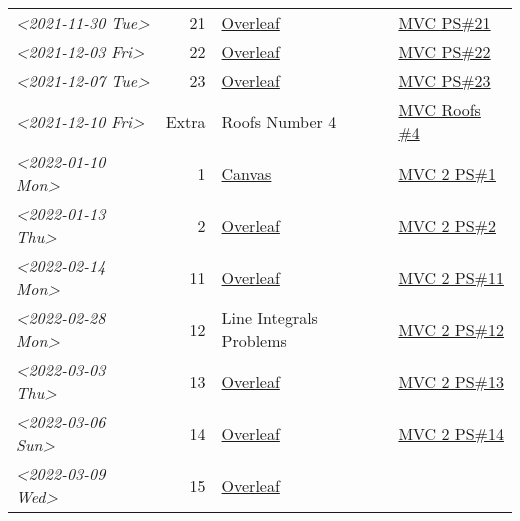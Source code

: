 \documentclass[letterpaper]{article}
\begin{document}
\begin{center}
\begin{tabular}{lrll}
\textit{<2021-11-30 Tue>} & 21 & \href{https://www.overleaf.com/read/ycjqxsjqhrqs}{Overleaf} & \href{../../../src/mathematics/multi_variable_calculus/KBhmvc_ps_21.org}{MVC PS\#21}\\
\textit{<2021-12-03 Fri>} & 22 & \href{https://www.overleaf.com/project/61aa47650d65cd6936cfd852}{Overleaf} & \href{../../../src/mathematics/multi_variable_calculus/KBhmvc_ps_22.org}{MVC PS\#22}\\
\textit{<2021-12-07 Tue>} & 23 & \href{https://www.overleaf.com/project/61ae7329269279ccbccb269f}{Overleaf} & \href{../../../src/mathematics/multi_variable_calculus/KBhmvc_ps_23.org}{MVC PS\#23}\\
\textit{<2021-12-10 Fri>} & Extra & Roofs Number 4 & \href{../../../src/mathematics/multi_variable_calculus/KBhmvc_roofs_4.org}{MVC Roofs \#4}\\
\textit{<2022-01-10 Mon>} & 1 & \href{https://nuevaschool.instructure.com/courses/4135/assignments/65916}{Canvas} & \href{../../../src/mathematics/multi_variable_calculus/KBhmvc_2_ps_1.org}{MVC 2 PS\#1}\\
\textit{<2022-01-13 Thu>} & 2 & \href{https://www.overleaf.com/project/61108fb607d007017107a355}{Overleaf} & \href{../../../src/mathematics/multi_variable_calculus/KBhmvc_2_ps_2.org}{MVC 2 PS\#2}\\
\textit{<2022-02-14 Mon>} & 11 & \href{https://www.overleaf.com/project/62097f19f7ed6fe9dc5a9135}{Overleaf} & \href{../../../src/mathematics/multi_variable_calculus/KBhmvc_2_ps_11.org}{MVC 2 PS\#11}\\
\textit{<2022-02-28 Mon>} & 12 & Line Integrals Problems & \href{../../../src/mathematics/multi_variable_calculus/KBhmvc_2_ps_12.org}{MVC 2 PS\#12}\\
\textit{<2022-03-03 Thu>} & 13 & \href{https://nuevaschool.instructure.com/courses/4135/assignments/68062}{Overleaf} & \href{../../../src/mathematics/multi_variable_calculus/KBhmvc_2_ps_13.org}{MVC 2 PS\#13}\\
\textit{<2022-03-06 Sun>} & 14 & \href{https://www.overleaf.com/project/62256676ec39545fe42c6f44}{Overleaf} & \href{../../../src/mathematics/multi_variable_calculus/KBhmvc_2_ps_14.org}{MVC 2 PS\#14}\\
\textit{<2022-03-09 Wed>} & 15 & \href{https://www.overleaf.com/project/622917862b7a71d63c6cc565}{Overleaf} & \\
\end{tabular}
\end{center}
\end{document}

